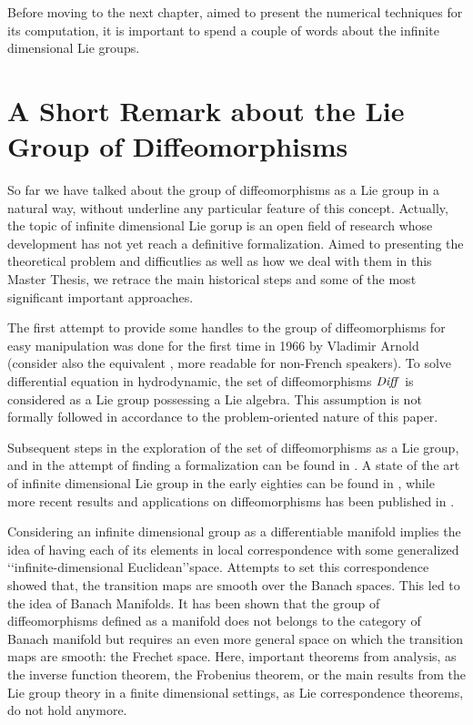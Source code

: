 Before moving to the next chapter, aimed to present the numerical techniques for its computation, it is important to spend a couple of words about the infinite dimensional Lie groups.

\section{A Short Remark about the Lie Group of Diffeomorphisms}

So far we have talked about the group of diffeomorphisms as a Lie group in a natural way, without underline any particular feature of this concept. Actually, the topic of infinite dimensional Lie gorup is an open field of research whose development has not yet reach a definitive formalization.
Aimed to presenting the theoretical problem and difficutlies as well as how we deal with them in this Master Thesis, we retrace the main historical steps and some of the most significant important approaches.

The first attempt to provide some handles to the group of diffeomorphisms for easy manipulation was done for the first time in 1966 by Vladimir Arnold \cite{arnold1966geometrie} (consider also the equivalent \cite{arnold1998topological}, more readable for non-French speakers). To solve differential equation in hydrodynamic, the set of diffeomorphisms $\text{\emph{Diff}}$ is considered as a Lie group possessing a Lie algebra. This assumption is not formally followed in accordance to the problem-oriented nature of this paper. 

Subsequent steps in the exploration of the set of diffeomorphisms as a Lie group, and in the attempt of finding a formalization can be found in \cite{marsden1970hamiltonian, ebin1970groups, omori1970group, michor1980manifolds, leslie1983lie}. A state of the art of  infinite dimensional Lie group in the early eighties can be found in \cite{Milnor:84:remarks}, while more recent results and applications on diffeomorphisms has been published in \cite{ovsienko1992integrals, bauer2010sobolev, schmid2010infinite,  bauer2011geodesic}.

Considering an infinite dimensional group as a differentiable manifold implies the idea of having each of its elements in local correspondence with some generalized \lq\lq infinite-dimensional Euclidean\rq\rq\phantom{z}space. Attempts to set this correspondence showed that, the transition maps are smooth over the Banach spaces. This led to the idea of Banach Manifolds. It has been shown \cite{khesin2008geometry} that the group of diffeomorphisms defined as a manifold does not belongs to the category of Banach manifold but requires an even more general space on which the transition maps are smooth: the Frechet space. Here, important theorems from analysis, as the inverse function theorem, the Frobenius theorem, or the main results from the Lie group theory in a finite dimensional settings, as Lie correspondence theorems, do not hold anymore. 

